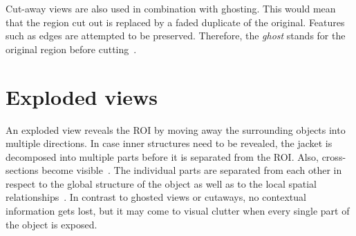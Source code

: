 Cut-away views are also used in combination with ghosting. This would mean that the region cut out is replaced by a faded duplicate of the original. Features such as edges are attempted to be preserved. Therefore, the \emph{ghost} stands for the original region before cutting~\cite{proc:volumeshop}.

\section{Exploded views}
An exploded view reveals the ROI by moving away the surrounding objects into multiple directions. In case inner structures need to be revealed, the jacket is decomposed into multiple parts before it is separated from the ROI. Also, cross-sections become visible~\cite{jour:explodedView}. The individual parts are separated from each other in respect to the global structure of the object as well as to the local spatial relationships~\cite{jour:generationExplodedView}. In contrast to ghosted views or cutaways, no contextual information gets lost, but it may come to visual clutter when every single part of the object is exposed.

